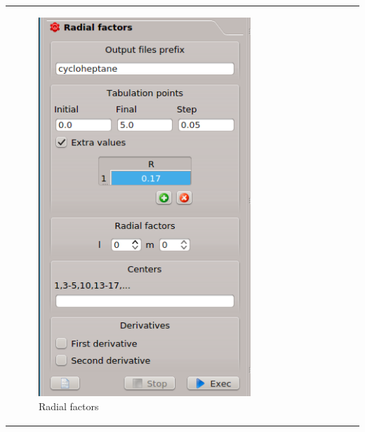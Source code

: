 \documentclass[10pt]{article}
\begin{document}
\begin{tabular}{lcr}
\hspace*{-3mm}
\begin{minipage}{.3\linewidth}
\begin{figure}[H]
\begin{center}
\includegraphics[width=.7\linewidth]{damqt_fig_2_11.png}
\end{center}
\caption{{Radial factors}\label{fig:2_11}}
\end{figure}
\end{minipage}
&
\begin{minipage}{.3\linewidth}
\begin{figure}[H]
\begin{center}
\vspace*{5mm}

\end{center}
\end{figure}
\end{minipage}
\end{tabular}
\end{document}
